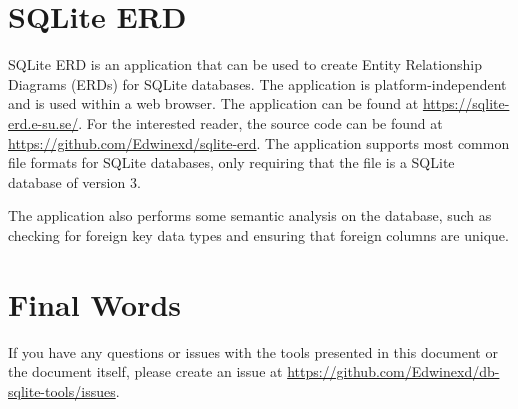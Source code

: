 \documentclass[a4paper,11pt,oneside]{article}
\begin{document}
\begin{sloppypar}
\section{SQLite ERD}
\label{sqliteERD}
SQLite ERD is an application that can be used to create Entity Relationship Diagrams (ERDs) for SQLite databases. The application is platform-independent and is used within a web browser. The application can be found at \url{https://sqlite-erd.e-su.se/}. For the interested reader, the source code can be found at \url{https://github.com/Edwinexd/sqlite-erd}.
The application supports most common file formats for SQLite databases, only requiring that the file is a SQLite database of version 3.

The application also performs some semantic analysis on the database, such as checking for foreign key data types and ensuring that foreign columns are unique.


\section{Final Words}
\label{finalWords}
If you have any questions or issues with the tools presented in this document or the document itself, please create an issue at \url{https://github.com/Edwinexd/db-sqlite-tools/issues}.

\pagebreak



\end{sloppypar}
\end{document}
